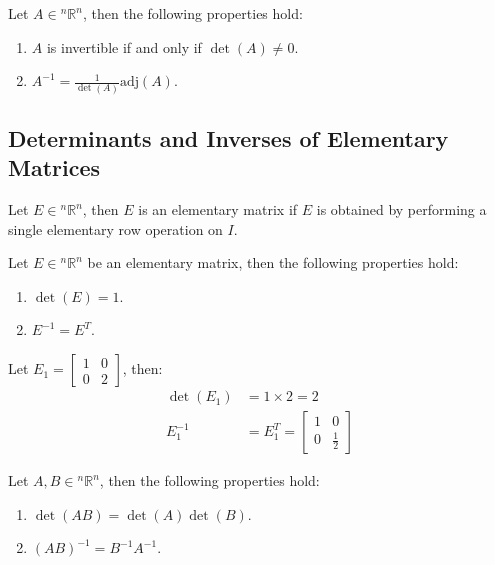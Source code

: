 \documentclass[11pt]{report}
\begin{document}
\begin{theorem}
    Let $A \in  {^n\mathbb{R}^n}$, then the following properties hold:
    \begin{enumerate}
        \item $A$ is invertible if and only if $\det(A) \neq 0$.
        \item $A^{-1} = \frac{1}{\det(A)}\text{adj}(A)$.
    \end{enumerate}
\end{theorem}
\subsection{Determinants and Inverses of Elementary Matrices}
\begin{definition}
    Let $E \in  {^n\mathbb{R}^n}$, then $E$ is an elementary matrix if $E$ is obtained by performing a single elementary row operation on $I$.
\end{definition}
\begin{theorem}
    Let $E \in  {^n\mathbb{R}^n}$ be an elementary matrix, then the following properties hold:
    \begin{enumerate}
        \item $\det(E) = 1$.
        \item $E^{-1} = E^T$.
    \end{enumerate}
\end{theorem}
\begin{example}
    Let $E_1 = \begin{bmatrix} 1 & 0 \\ 0 & 2 \end{bmatrix}$, then:
    \begin{align*}
        \det(E_1) &= 1 \times 2 = 2 \\
        E_1^{-1} &= E_1^T = \begin{bmatrix} 1 & 0 \\ 0 & \frac{1}{2} \end{bmatrix}
    \end{align*}
\end{example}
\begin{theorem}
    Let $A, B \in  {^n\mathbb{R}^n}$, then the following properties hold:
    \begin{enumerate}
        \item $\det(AB) = \det(A)\det(B)$.
        \item $(AB)^{-1} = B^{-1}A^{-1}$.
    \end{enumerate}
\end{theorem}
\end{document}
